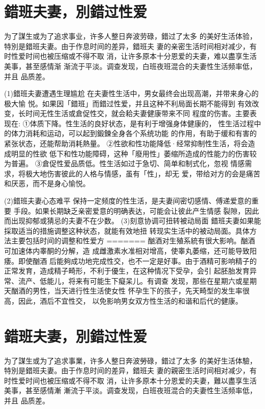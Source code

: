 \documentclass[12pt,UTF8]{ctexbook}
\begin{document}
\section{錯班夫妻，別錯过性爱}

为了謀生或为了追求事业，许多人整日奔波劳碌，錯过了太多
的美好生活体验，特別是錯班夫妻。由于作息时间的差异，錯班夫
妻的亲密生活时间相对减少，有时性爱时间也被压缩或不得不取
消，让许多原本十分恩爱的夫妻，难以盡享生活美事，甚至感情渐
渐流于平淡。调查发现，白班夜班混合的夫妻性生活频率低，并且
品质差。

(1)錯班夫妻遭遇生理尴尬
在夫妻性生活中，男女最终会出现高潮，并带来身心的极大愉
悦。如果因「錯班」而錯过性爱，并且这种不利局面长期不能得到
有效改变，长时间无性生活或倉促性交，就会耠夫妻健康带来不同
程度的伤害。主要表现在:
①体质下降。性生活的良好状态，是有利于增强身体健康的，
性生活过程中的体力消耗和运动，可以起到鍛鍊全身各个系统功能
的作用，有助于缓和有害的紧张状态，还能帮助消耗熱量。
②性欲和性功能降低·经常抑制性生活，将会造成明显的性欲
低下和性功能障碍，这种「廢用性」萎缩所造成的性能力的伤害较
为普遍。
③倉促性爱品质低。性生活如过于急切、简单和制式化，忽视
情感需求，将极大地伤害彼此的人格与情感，虽有「性」，却无
爱，带给对方的会是痛苦和厌恶，而不是身心愉悦。

(2)錯班夫妻心态难平
保持一定频度的性生活，是夫妻间密切感情、傅递爱意的重要
手段。如果长期缺乏亲密爱意的明确表达，可能会让彼此产生情感
裂隙，因此而出现抑郁或猜忌的夫妻不在少数。
(3)刻意协调可扭转被动局面
錯班夫妻如果能採取适当的措施调整这种状态，就能有效地扭
转现实生活中的被动局面。具体方法主要包括时间的调整和性爱方
=======
酗酒对生殖系統有很大影响。酗酒可加速体内睾酮的分解，造
成雌激素水准相对增高，使睾丸萎缩，还可能导致阳痿。即使酗酒
后能夠成功地完成性交，也不一定是好事。由于酒精可影响精子的
正常发育，造成精子畸形，不利于優生，在这种情况下受孕，会引
起胚胎发育异常、流产、低能儿，将来有可能生下癡呆儿。有调查
发现，那些在星期六或星期天酗酒的男性，当天进行性生活使女性
怀孕生下的孩子，先天畸型的发生率很高，因此，酒后不宜性交，
以免影响男女双方性生活的和谐和后代的健康。

\section{錯班夫妻，別錯过性爱}

为了謀生或为了追求事業，许多人整日奔波勞碌，錯过了太多
的美好生活体驗，特別是錯班夫妻。由于作息时间的差异，錯班夫
妻的親密生活时间相对减少，有时性爱时间也被压缩或不得不取
消，让许多原本十分恩爱的夫妻，難以盡享生活美事，甚至感情漸
漸流于平淡。调查发现，白班夜班混合的夫妻性生活频率低，并且
品质差。
\end{document}
